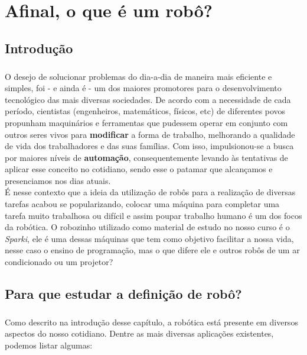 \chapter{Afinal, o que é um robô?}
\section*{Introdução}
\paragraph{}
O desejo de solucionar problemas do dia-a-dia de maneira mais eficiente e simples, foi - e ainda é - um dos maiores promotores para o desenvolvimento tecnológico das mais diversas sociedades. De acordo com a necessidade de cada período, cientistas (engenheiros, matemáticos, físicos, etc) de diferentes povos propunham maquinários e ferramentas que pudessem operar em conjunto com outros seres vivos para \textbf{modificar} a forma de trabalho, melhorando a qualidade de vida dos trabalhadores e das suas famílias. Com isso, impulsionou-se a busca por maiores níveis de \textbf{automação}, consequentemente levando às tentativas de aplicar esse conceito no cotidiano, sendo esse o patamar que alcançamos e presenciamos nos dias atuais.\\

É nesse contexto que a ideia da utilização de robôs para a realização de diversas tarefas acabou se popularizando, colocar uma máquina para completar uma tarefa muito trabalhosa ou difícil e assim poupar trabalho humano é um dos focos da robótica. O robozinho utilizado como material de estudo no nosso curso é o \textit{Sparki}, ele é uma dessas máquinas que tem como objetivo facilitar a nossa vida, nesse caso o ensino de programação, mas o que difere ele e outros robôs de um ar condicionado ou um projetor? \par

\section{Para que estudar a definição de robô?}

\paragraph{}
Como descrito na introdução desse capítulo, a robótica está presente em diversos aspectos do nosso cotidiano. Dentre as mais diversas aplicações existentes, podemos listar algumas:


